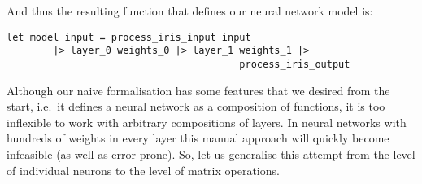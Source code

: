 \documentclass[runningheads]{llncs}
\begin{document}
And thus the resulting function that defines our neural network model is:


\begin{lstlisting}[language=caml]
let model input = process_iris_input input
        |> layer_0 weights_0 |> layer_1 weights_1 |>
                                        process_iris_output
\end{lstlisting}

Although our naive formalisation has some features that we desired from the start, i.e.\ it defines a neural network as a composition of functions,
it is too inflexible to work with arbitrary compositions of layers.
In neural networks with hundreds of weights in every layer this manual approach will quickly become infeasible (as well as error prone).
So, let us generalise this attempt from the level of individual neurons to the level of matrix operations.
\end{document}

